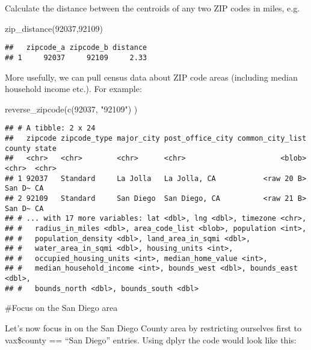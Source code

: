 \documentclass[
]{article}
\newenvironment{Shaded}{\begin{snugshade}}{\end{snugshade}}
\newcommand{\FunctionTok}[1]{\textcolor[rgb]{0.00,0.00,0.00}{#1}}
\newcommand{\NormalTok}[1]{#1}
\newcommand{\StringTok}[1]{\textcolor[rgb]{0.31,0.60,0.02}{#1}}
\begin{document}
Calculate the distance between the centroids of any two ZIP codes in
miles, e.g.

\begin{Shaded}
\begin{Highlighting}[]
\FunctionTok{zip\_distance}\NormalTok{(}\StringTok{\textquotesingle{}92037\textquotesingle{}}\NormalTok{,}\StringTok{\textquotesingle{}92109\textquotesingle{}}\NormalTok{)}
\end{Highlighting}
\end{Shaded}

\begin{verbatim}
##   zipcode_a zipcode_b distance
## 1     92037     92109     2.33
\end{verbatim}

More usefully, we can pull census data about ZIP code areas (including
median household income etc.). For example:

\begin{Shaded}
\begin{Highlighting}[]
\FunctionTok{reverse\_zipcode}\NormalTok{(}\FunctionTok{c}\NormalTok{(}\StringTok{\textquotesingle{}92037\textquotesingle{}}\NormalTok{, }\StringTok{"92109"}\NormalTok{) )}
\end{Highlighting}
\end{Shaded}

\begin{verbatim}
## # A tibble: 2 x 24
##   zipcode zipcode_type major_city post_office_city common_city_list county state
##   <chr>   <chr>        <chr>      <chr>                      <blob> <chr>  <chr>
## 1 92037   Standard     La Jolla   La Jolla, CA           <raw 20 B> San D~ CA   
## 2 92109   Standard     San Diego  San Diego, CA          <raw 21 B> San D~ CA   
## # ... with 17 more variables: lat <dbl>, lng <dbl>, timezone <chr>,
## #   radius_in_miles <dbl>, area_code_list <blob>, population <int>,
## #   population_density <dbl>, land_area_in_sqmi <dbl>,
## #   water_area_in_sqmi <dbl>, housing_units <int>,
## #   occupied_housing_units <int>, median_home_value <int>,
## #   median_household_income <int>, bounds_west <dbl>, bounds_east <dbl>,
## #   bounds_north <dbl>, bounds_south <dbl>
\end{verbatim}

\#Focus on the San Diego area

Let's now focus in on the San Diego County area by restricting ourselves
first to vax\$county == ``San Diego'' entries. Using dplyr the code
would look like this:
\end{document}
